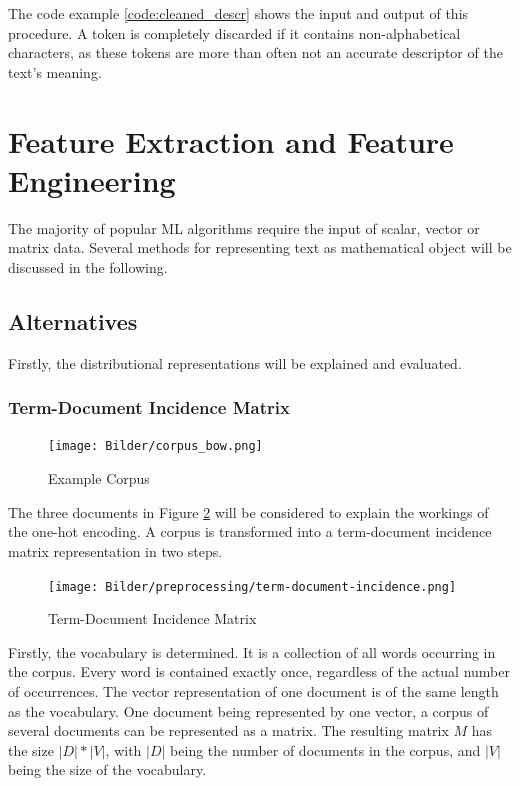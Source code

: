 	 The code example \ref{code:cleaned_descr} shows the input and output of this procedure. A token is completely discarded if it contains non-alphabetical characters, as these tokens are more than often not an accurate descriptor of the text's meaning.	

        
        \section{Feature Extraction and Feature Engineering}
        \label{section:feature-extraction}
        The majority of popular \ac{ML} algorithms require the input of scalar, vector or matrix data. Several methods for representing text as mathematical object will be discussed in the following.
    
            \subsection{Alternatives}
            Firstly, the distributional representations will be explained and evaluated.
            
            \subsubsection{Term-Document Incidence Matrix}
			\label{section:tdim}
            \begin{figure}[h]
            	\centering
            	 \texttt{[image: Bilder/corpus\_bow.png]}
            	\caption{Example Corpus}
            	\label{fig:corpus}
            \end{figure}
            The three documents in Figure \ref{fig:corpus} will be considered to explain the workings of the one-hot encoding. A corpus is transformed into a term-document incidence matrix representation in two steps. 
            
            \begin{figure}[h!]
            	\centering
            	\texttt{[image: Bilder/preprocessing/term-document-incidence.png]}
            	\caption{Term-Document Incidence Matrix}
            	\label{fig:corpus}
            \end{figure}
            
            Firstly, the vocabulary is determined. 
            It is a collection of all words occurring in the corpus. Every word is contained exactly once, regardless of the actual number of occurrences. The vector representation of one document is of the same length as the vocabulary. One document being represented by one vector, a corpus of several documents can be represented as a matrix. The resulting matrix $M$ has the size $ |D|*|V| $, with $|D|$ being the number of documents in the corpus, and $|V|$ being the size of the vocabulary.
            
